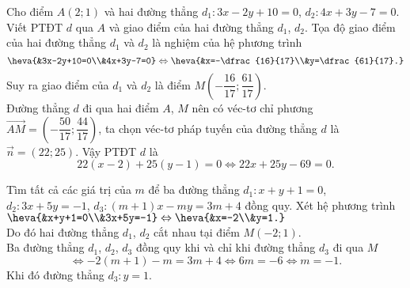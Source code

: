	\begin{bt}%
		Cho điểm $A(2;1)$ và hai đường thẳng $d_1\colon 3x-2y+10=0$, $d_2\colon 4x+3y-7=0$. Viết PTĐT $d$ qua $A$ và giao điểm của hai đường thẳng $d_1$, $d_2$.
		\loigiai
		{Tọa độ giao điểm của hai đường thẳng $d_1$ và $d_2$ là nghiệm của hệ phương trình 
			$$\heva{&3x-2y+10=0\\&4x+3y-7=0} \Leftrightarrow \heva{&x=-\dfrac{16}{17}\\&y=\dfrac{61}{17}.}$$
			Suy ra giao điểm của $d_1$ và $d_2$ là điểm $M\left(-\dfrac{16}{17};\dfrac{61}{17}\right)$.\\
			Đường thẳng $d$ đi qua hai điểm $A$, $M$ nên có véc-tơ chỉ phương $\overrightarrow{AM}=\left(-\dfrac{50}{17};\dfrac{44}{17}\right)$, ta chọn véc-tơ pháp tuyến của đường thẳng $d$ là $\overrightarrow{n}=\left(22;25\right)$. Vậy PTĐT $d$ là
			$$22(x-2)+25(y-1)=0 \Leftrightarrow 22x+25y-69=0.$$}
	\end{bt}
	
	\begin{bt}%
		Tìm tất cả các giá trị của $m$ để ba đường thẳng $d_1\colon x+y+1=0$, $d_2\colon 3x+5y=-1$, $d_3\colon (m+1)x-my=3m+4$ đồng quy.
		\loigiai
		{Xét hệ phương trình $\heva{&x+y+1=0\\&3x+5y=-1}\Leftrightarrow \heva{&x=-2\\&y=1.}$\\
			Do đó hai đường thẳng $d_1$, $d_2$ cắt nhau tại điểm $M(-2;1)$.\\
			Ba đường thẳng $d_1$, $d_2$, $d_3$ đồng quy khi và chỉ khi đường thẳng $d_3$ đi qua $M$ 
			$$\Leftrightarrow -2\left(m+1\right)-m=3m+4 \Leftrightarrow 6m=-6 \Leftrightarrow m=-1.$$
			Khi đó đường thẳng $d_3\colon y=1$.}
	\end{bt}
	
